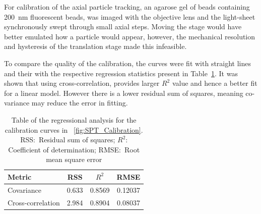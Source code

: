 For calibration of the axial particle tracking, an agarose gel of beads containing \SI{200}{\nano\meter} fluorescent beads, was imaged with the objective lens and the light-sheet synchronously swept through small axial steps.
Moving the stage would have better emulated how a particle would appear, however, the mechanical resolution and hysteresis of the translation stage made this infeasible.

To compare the quality of the calibration, %
the curves were fit with straight lines and their with the respective regression statistics present in Table~\ref{tab:linear_calibration}.
It was shown that using cross-correlation, provides larger \(R^2\) value and hence a better fit for a linear model. %
However there is a lower residual sum of squares, meaning co-variance may reduce the error in fitting.


\begin{table}
\centering
\caption{Table of the regressional analysis for the calibration curves in \figurename~\ref{fig:SPT_Calibration}.
RSS:~Residual sum of squares; \(R^2\): Coefficient of determination; RMSE:~Root mean square error}\label{tab:linear_calibration}
  \begin{tabular}{lccc}
    \toprule
    Metric & RSS & \(R^2\) & RMSE \\\midrule
    Covariance & 0.633 & 0.8569 & 0.12037 \\
    Cross-correlation & 2.984 & 0.8904 & 0.08037 \\
    \bottomrule
  \end{tabular}
\end{table}



